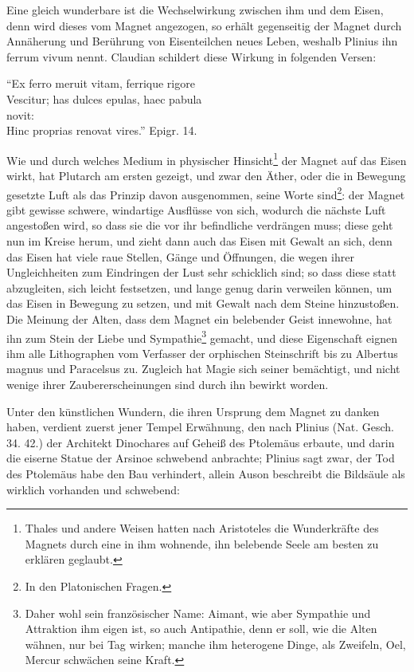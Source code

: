 \documentclass[a4paper, 11pt, oneside, polutonikogreek, german]{article}
\begin{document}
Eine gleich wunderbare ist die Wechselwirkung zwischen ihm und dem Eisen, denn wird dieses vom Magnet angezogen, so erhält gegenseitig der Magnet durch Annäherung und Berührung von Eisenteilchen neues Leben, weshalb Plinius ihn ferrum vivum nennt. Claudian schildert diese Wirkung in folgenden Versen:

"`Ex ferro meruit vitam, ferrique rigore\\
\hspace*{0.5cm} Vescitur; has dulces epulas, haec pabula\\
\hspace*{1.5cm} novit:\\
\hspace*{0.5cm} Hinc proprias renovat vires."' Epigr. 14.

Wie und durch welches Medium in physischer Hinsicht\footnote{Thales und andere Weisen hatten nach Aristoteles die Wunderkräfte des Magnets durch eine in ihm wohnende, ihn belebende Seele am besten zu erklären geglaubt.} der Magnet auf das Eisen wirkt, hat Plutarch am ersten gezeigt, und zwar den Äther, oder die in Bewegung gesetzte Luft als das Prinzip davon ausgenommen, seine Worte sind\footnote{In den Platonischen Fragen.}: der Magnet gibt gewisse schwere, windartige Ausflüsse von sich, wodurch die nächste Luft angestoßen wird, so dass sie die vor ihr befindliche verdrängen muss; diese geht nun im Kreise herum, und zieht dann auch das Eisen mit Gewalt an sich, denn das Eisen hat viele raue Stellen, Gänge und Öffnungen, die wegen ihrer Ungleichheiten zum Eindringen der Lust sehr schicklich sind; so dass diese statt abzugleiten, sich leicht festsetzen, und lange genug darin verweilen können, um das Eisen in Bewegung zu setzen, und mit Gewalt nach dem Steine hinzustoßen. Die Meinung der Alten, dass dem Magnet ein belebender Geist innewohne, hat ihn zum Stein der Liebe und Sympathie\footnote{Daher wohl sein französischer Name: Aimant, wie aber Sympathie und Attraktion ihm eigen ist, so auch Antipathie, denn er soll, wie die Alten wähnen, nur bei Tag wirken; manche ihm heterogene Dinge, als Zweifeln, Oel, Mercur schwächen seine Kraft.} gemacht, und diese Eigenschaft eignen ihm alle Lithographen vom Verfasser der orphischen Steinschrift bis zu Albertus magnus und Paracelsus zu. Zugleich hat Magie sich seiner bemächtigt, und nicht wenige ihrer Zaubererscheinungen sind durch ihn bewirkt worden.

Unter den künstlichen Wundern, die ihren Ursprung dem Magnet zu danken haben, verdient zuerst jener Tempel Erwähnung, den nach Plinius (Nat. Gesch. 34. 42.) der Architekt Dinochares auf Geheiß des Ptolemäus erbaute, und darin die eiserne Statue der Arsinoe schwebend anbrachte; Plinius sagt zwar, der Tod des Ptolemäus habe den Bau verhindert, allein Auson beschreibt die Bildsäule als wirklich vorhanden und schwebend:
\end{document}
